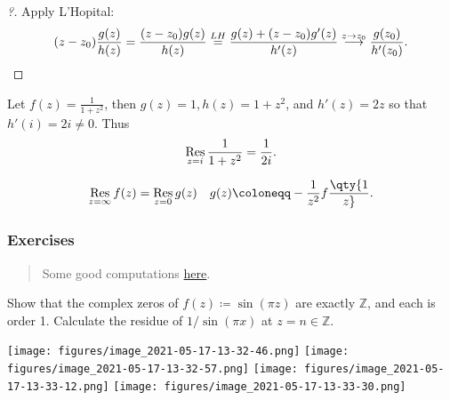 \begin{proof}[?]

Apply L'Hopital:
\begin{align*}
(z-z_0) {g(z) \over h(z)} = {(z-z_0) g(z) \over h(z) } \overset{LH}{=}
{g(z) + (z-z_0) g'(z) \over h'(z)} \overset{z\to z_0}\longrightarrow{g(z_0) \over h'(z_0)}
.\end{align*}

\end{proof}

\begin{example}

Let \(f(z) = \frac{1}{1+z^2}\), then \(g(z) = 1, h(z) = 1+z^2\), and
\(h'(z) = 2z\) so that \(h'(i) = 2i \neq 0\). Thus
\begin{align*}
\mathop{\mathrm{Res}}_{z=i}{1\over 1+z^2} = \frac{1}{2i}
.\end{align*}

\end{example}

\begin{proposition}

\begin{align*}
\mathop{\mathrm{Res}}_{z=\infty}f(z) = \mathop{\mathrm{Res}}_{z=0} g(z) && g(z) \coloneqq-{1 \over z^2}f\qty{1\over z} 
.\end{align*}

\end{proposition}

\hypertarget{exercises-3}{%
\subsubsection{Exercises}\label{exercises-3}}

\begin{quote}
Some good computations
\href{https://math.mit.edu/~jorloff/18.04/notes/topic9.pdf}{here}.
\end{quote}

\begin{exercise}

Show that the complex zeros of \(f(z) \coloneqq\sin(\pi z)\) are exactly
\({\mathbb{Z}}\), and each is order 1. Calculate the residue of
\(1/\sin(\pi x)\) at \(z=n\in {\mathbb{Z}}\).

\end{exercise}

\texttt{[image: figures/image\_2021-05-17-13-32-46.png]}
\texttt{[image: figures/image\_2021-05-17-13-32-57.png]}
\texttt{[image: figures/image\_2021-05-17-13-33-12.png]}
\texttt{[image: figures/image\_2021-05-17-13-33-30.png]}

